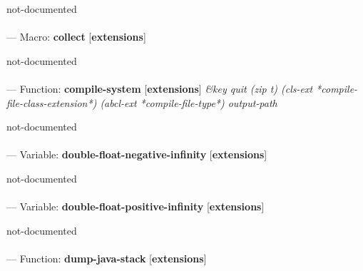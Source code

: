 \begin{adjustwidth}{5em}{5em}
not-documented
\end{adjustwidth}

\paragraph{}
\label{EXTENSIONS:COLLECT}
--- Macro: \textbf{collect} [\textbf{extensions}] \textit{}

\begin{adjustwidth}{5em}{5em}
not-documented
\end{adjustwidth}

\paragraph{}
\label{EXTENSIONS:COMPILE-SYSTEM}
--- Function: \textbf{compile-system} [\textbf{extensions}] \textit{\&key quit (zip t) (cls-ext *compile-file-class-extension*) (abcl-ext *compile-file-type*) output-path}

\begin{adjustwidth}{5em}{5em}
not-documented
\end{adjustwidth}

\paragraph{}
\label{EXTENSIONS:DOUBLE-FLOAT-NEGATIVE-INFINITY}
--- Variable: \textbf{double-float-negative-infinity} [\textbf{extensions}] \textit{}

\begin{adjustwidth}{5em}{5em}
not-documented
\end{adjustwidth}

\paragraph{}
\label{EXTENSIONS:DOUBLE-FLOAT-POSITIVE-INFINITY}
--- Variable: \textbf{double-float-positive-infinity} [\textbf{extensions}] \textit{}

\begin{adjustwidth}{5em}{5em}
not-documented
\end{adjustwidth}

\paragraph{}
\label{EXTENSIONS:DUMP-JAVA-STACK}
--- Function: \textbf{dump-java-stack} [\textbf{extensions}] \textit{}

